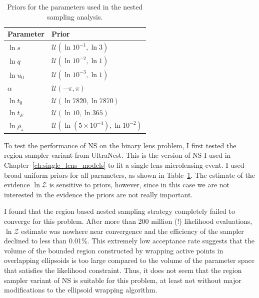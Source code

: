 \documentclass[12pt,dvipsnames]{report}
\newcommand{\ssf}[1]{\textsf{#1}}
\begin{document}
\begin{table}[h!]
\centering
\begin{tabular}{ll}
 \toprule
 Parameter & Prior\\
    \midrule
    $\ln s$ & $\mathcal{U}(\ln 10^{-1}, \ln 3)$\\
    $\ln q$ & $\mathcal{U}(\ln 10^{-2}, \ln 1)$\\
    $\ln u_0$ & $\mathcal{U}(\ln 10^{-3}, \ln 1)$\\
    $\alpha$ & $\mathcal{U}(-\pi, \pi)$\\
    $\ln t_0$ & $\mathcal{U}(\ln 7820, \ln 7870)$\\
    $\ln t_E$ & $\mathcal{U}(\ln 10, \ln 365)$\\
    $\ln \rho_\star$ & $\mathcal{U}(\ln (5\times 10^{-4}), \ln 10^{-2})$\\
    \bottomrule
\end{tabular}
\caption{Priors for the parameters used in the nested sampling analysis.}
\label{tab:priors_ns}
\end{table}


To test the performance of NS on the binary lens problem, I first tested the region 
sampler variant from \ssf{UltraNest}. This is the version of NS I used 
in Chapter~\ref{ch:single_lens_models} to fit a single lens microlensing event. 
I used broad uniform priors for all parameters, as shown in Table~\ref{tab:priors_ns}.
The estimate of the evidence
$\ln\mathcal{Z}$ is sensitive to priors, however, since in this case we are not interested in the evidence 
the priors are not really important.

I found that the region based nested sampling strategy completely failed to converge 
for this problem. After more than 200 million (!) likelihood evaluations,  $\ln\mathcal{Z}$ estimate
was nowhere near convergence and the efficiency of the sampler declined to less than 0.01\%.
This extremely low acceptance rate suggests that the volume of the bounded region constructed by wrapping 
active points in overlapping ellipsoids is too large compared to the volume of the parameter space 
that satisfies the likelihood constraint.
Thus, it does not seem that the region sampler variant of NS is suitable for this problem,
at least not without major modifications to the ellipsoid wrapping algorithm.
\end{document}
